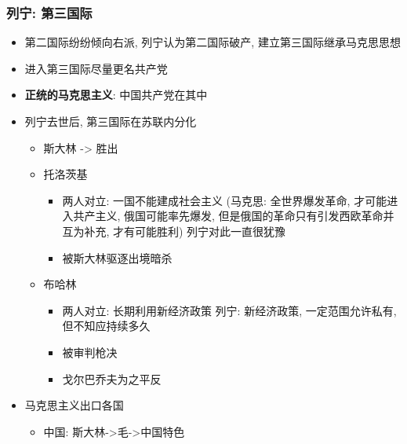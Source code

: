 \documentclass[11pt]{article}
\begin{document}
\subsubsection{列宁: 第三国际}
\label{sec:org85c9945}
\begin{itemize}
\item 第二国际纷纷倾向右派, 列宁认为第二国际破产, 建立第三国际继承马克思思想
\item 进入第三国际尽量更名共产党
\item \textbf{正统的马克思主义}: 中国共产党在其中
\item 列宁去世后, 第三国际在苏联内分化
\begin{itemize}
\item 斯大林 -> 胜出
\item 托洛茨基
\begin{itemize}
\item 两人对立: 一国不能建成社会主义
(马克思: 全世界爆发革命, 才可能进入共产主义, 俄国可能率先爆发, 但是俄国的革命只有引发西欧革命并互为补充, 才有可能胜利)
列宁对此一直很犹豫
\item 被斯大林驱逐出境暗杀
\end{itemize}
\item 布哈林
\begin{itemize}
\item 两人对立: 长期利用新经济政策
列宁: 新经济政策, 一定范围允许私有, 但不知应持续多久
\item 被审判枪决
\item 戈尔巴乔夫为之平反
\end{itemize}
\end{itemize}
\item 马克思主义出口各国
\begin{itemize}
\item 中国: 斯大林->毛->中国特色
\end{itemize}
\end{itemize}
\end{document}
